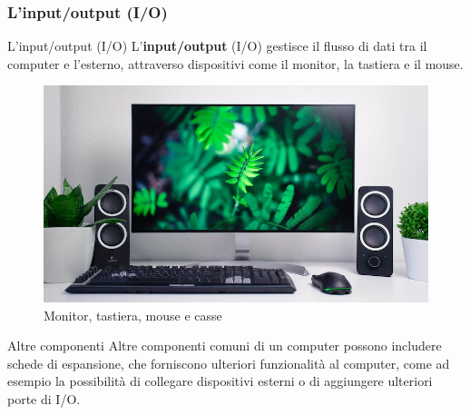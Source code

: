 \subsubsection[L'input/output (I/O)]{L'input/output (I/O)}
\begin{frame}
	
	\begin{block}{L'input/output (I/O)} 
		L'\textbf{input/output} (I/O) gestisce il flusso di dati tra il computer e l'esterno, attraverso dispositivi come il monitor, la tastiera e il mouse.
	\end{block}
	
	\begin{figure}[!htbp] 
		\centering
		\includegraphics[width=0.8\linewidth]{images/2_le_architetture/io.jpg}
		\caption{Monitor, tastiera, mouse e casse}
		\label{fig:architectures_io}
	\end{figure}
	 
\end{frame}


\begin{frame}
	
	\begin{block}{Altre componenti}
		Altre componenti comuni di un computer possono includere schede di espansione, che forniscono ulteriori funzionalità al computer, come ad esempio la possibilità di collegare dispositivi esterni o di aggiungere ulteriori porte di I/O.
	\end{block}
	
	
\end{frame}


